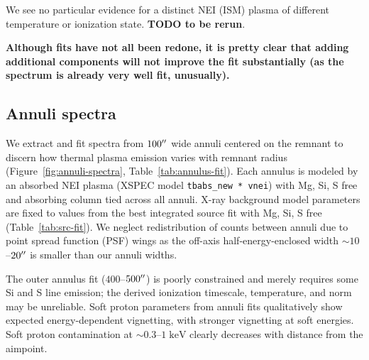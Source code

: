 \documentclass[preprint2,tighten,trackchanges]{aastex6}
\newcommand*{\mt}{\mathrm}
\newcommand*{\unit}[1]{\;\mt{#1}}  %
\newcommand*{\abt}{\mathord{\sim}} %
\begin{document}
We see no particular evidence for a distinct NEI (ISM) plasma of different
temperature or ionization state.
\textbf{TODO to be rerun}.

\textbf{Although fits have not all been redone, it is pretty clear that adding
additional components will not improve the fit substantially (as the spectrum
is already very well fit, unusually).}

\subsection{Annuli spectra}

We extract and fit spectra from $100\mbox{$^{\prime\prime}$}$ wide annuli centered on the
remnant to discern how thermal plasma emission varies with remnant radius
(Figure~\ref{fig:annuli-spectra}, Table~\ref{tab:annulus-fit}).
Each annulus is modeled by an absorbed NEI plasma
(XSPEC model \texttt{tbabs\_new * vnei}) with Mg, Si, S free and absorbing
column tied across all annuli.
X-ray background model parameters are fixed to values from the best integrated
source fit with Mg, Si, S free (Table~\ref{tab:src-fit}).  %
We neglect redistribution of counts between annuli due to point spread function
(PSF) wings as the off-axis half-energy-enclosed width $\abt10$--$20\mbox{$^{\prime\prime}$}$ is
smaller than our annuli widths.

The outer annulus fit ($400$--$500\mbox{$^{\prime\prime}$}$) is poorly constrained and merely
requires some Si and S line emission; the derived ionization timescale,
temperature, and norm may be unreliable.
Soft proton parameters from annuli fits qualitatively show expected
energy-dependent vignetting, with stronger vignetting at soft energies.
Soft proton contamination at $\abt 0.3$--$1 \unit{keV}$ clearly decreases with
distance from the aimpoint.
\end{document}
